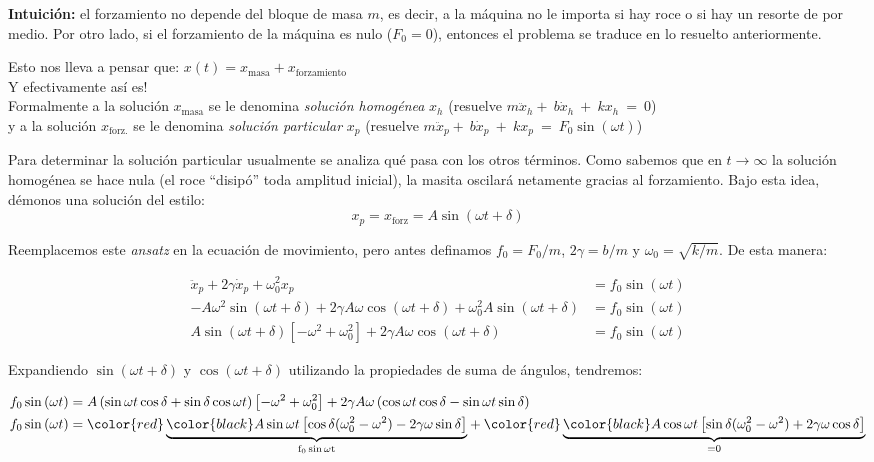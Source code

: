 \documentclass[letterpaper,11pt]{article}
\begin{document}
\noindent\textbf{Intuición:} el forzamiento no depende del bloque de masa $m$, es decir, a la máquina no le importa si hay roce o si hay un resorte de por medio. Por otro lado, si el forzamiento de la máquina es nulo ($F_0=0$), entonces el problema se traduce en lo resuelto anteriormente.

\noindent Esto nos lleva a pensar que: $x(t) = x_\text{masa}+x_\text{forzamiento}$\\
\noindent Y efectivamente así es!\\
\noindent Formalmente a la solución $x_\text{masa}$ se le denomina \textit{solución homogénea} $x_h$ (resuelve $m\ddot{x}_h+~b\dot{x}_h~+~kx_h~=~0$)\\
\noindent y a la solución $x_\text{forz.}$ se le denomina \textit{solución particular} $x_p$ (resuelve $m\ddot{x}_p+~b\dot{x}_p~+~kx_p~=~F_0\sin{(\omega t)}$)

Para determinar la solución particular usualmente se analiza qué pasa con los otros términos. Como sabemos que en $t\rightarrow\infty$ la solución homogénea se hace nula (el roce ``disipó'' toda amplitud inicial), la masita oscilará netamente gracias al forzamiento. Bajo esta idea, démonos una solución del estilo:
$$x_p = x_\text{forz}=A\sin{(\omega t+\delta)}$$

\noindent Reemplacemos este \textit{ansatz} en la ecuación de movimiento, pero antes definamos $f_0=F_0/m$, $2\gamma=b/m$ y $\omega_0=\sqrt{k/m}$. De esta manera:

\begin{align*}
        \ddot{x}_{p}+2\gamma \dot{x}_p+\omega_0^2x_p&=f_0\sin{(\omega t)}\\
        -A\omega^2\sin{(\omega t+\delta)}+2\gamma A\omega\cos{(\omega t+\delta)}+\omega_0^2A\sin{(\omega t+\delta)}&=f_0\sin{(\omega t)}\\
        A\sin{(\omega t+\delta)}\left[-\omega^2+\omega_0^2\right]+2\gamma A\omega\cos{(\omega t+\delta)}&=f_0\sin{(\omega t)}
\end{align*}

\noindent Expandiendo $\sin{(\omega t+\delta)}$ y $\cos{(\omega t+\delta)}$ utilizando la propiedades de suma de 
ángulos, tendremos:

\begin{align*}
    f_0\sin{(\omega t)} &= A\left(\sin\omega t\cos\delta+\sin\delta\cos\omega t\right)\left[-\omega^2+\omega_0^2\right]+2\gamma A\omega \left(\cos\omega t\cos\delta - \sin\omega t\sin\delta\right)\\
    f_0\sin{(\omega t)} &= {\color{red}\underbrace{\color{black}A\sin\omega t\left[\cos\delta(\omega_0^2-\omega^2)-2\gamma\omega \sin\delta\right]}_\mathrm{f_0\sin\omega t}}+{\color{red}\underbrace{\color{black}A\cos\omega t\left[\sin\delta(\omega_0^2-\omega^2)+2\gamma\omega\cos\delta\right]}_\mathrm{=0}}
\end{align*}
\end{document}
